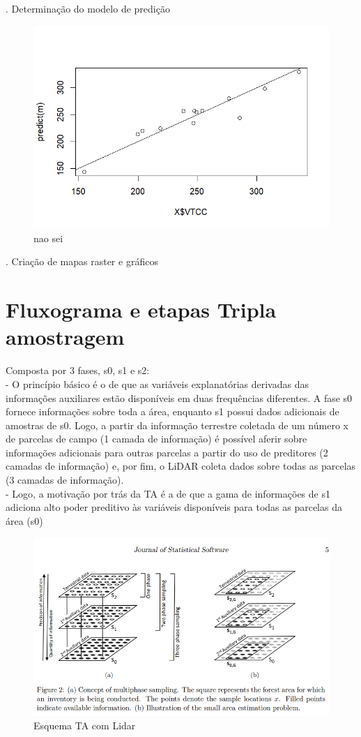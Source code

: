 \documentclass[
]{article}
\begin{document}
. Determinação do modelo de predição

\begin{figure}

{\centering \includegraphics[width=0.5\linewidth]{IMAGES/analise-de-regressao} 

}

\caption{nao sei}\label{fig:unnamed-chunk-20}
\end{figure}

. Criação de mapas raster e gráficos \newpage

\section{Fluxograma e etapas Tripla
amostragem}\label{fluxograma-e-etapas-tripla-amostragem}

Composta por 3 fases, s0, s1 e s2:\\
- O princípio básico é o de que as variáveis explanatórias derivadas das
informações auxiliares estão disponíveis em duas frequências diferentes.
A fase s0 fornece informações sobre toda a área, enquanto s1 possui
dados adicionais de amostras de s0. Logo, a partir da informação
terrestre coletada de um número x de parcelas de campo (1 camada de
informação) é possível aferir sobre informações adicionais para outras
parcelas a partir do uso de preditores (2 camadas de informação) e, por
fim, o LiDAR coleta dados sobre todas as parcelas (3 camadas de
informação).\\
- Logo, a motivação por trás da TA é a de que a gama de informações de
s1 adiciona alto poder preditivo às variáveis disponíveis para todas as
parcelas da área (s0)

\begin{figure}

{\centering \includegraphics[width=0.5\linewidth]{IMAGES/esquematizacao-TA} 

}

\caption{Esquema TA com Lidar}\label{fig:unnamed-chunk-21}
\end{figure}
\end{document}
